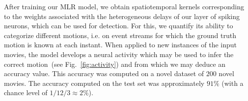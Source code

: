 \documentclass[default]{sn-jnl}%
\theoremstyle{thmstyleone}%
\theoremstyle{thmstyletwo}%
\theoremstyle{thmstylethree}%
\newcommand{\seeFig}[1]{see Fig.~\ref{fig:#1}}%
\begin{document}
After training our MLR model, we obtain spatiotemporal kernels corresponding to the weights associated with the heterogeneous delays of our layer of spiking neurons, which can be used for detection. For this, we quantify its ability to categorize different motions, i.e. on event streams for which the ground truth motion is known at each instant. When applied to new instances of the input movies, the model develops a neural activity which may be used to infer the correct motion~(\seeFig{activity}) and from which we may deduce an accuracy value. This accuracy was computed on a novel dataset of $200$ novel movies. The accuracy computed on the test set was approximately $91\%$ (with a chance level of $1 / 12/ 3 \approx 2\%$). %
\end{document}
